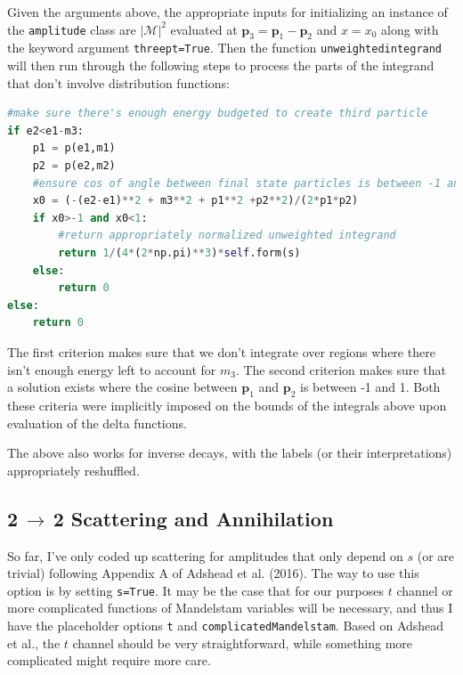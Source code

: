 \documentclass[superscriptaddress,nofootinbib,notitlepage,onecolumn]{revtex4-1}
\newcommand{\abs}[1]{\left| #1 \right|}
\renewcommand{\vec}[1]{\mathbf{#1}}
\newcommand{\code}[1]{\texttt{#1}}
\begin{document}
Given the arguments above, the appropriate inputs for initializing an instance of the \code{amplitude} class are $\abs{\mathcal{M}}^2$ evaluated at $\vec{p}_3 = \vec{p}_1 - \vec{p}_2$ and $x=x_0$ along with the keyword argument \code{threept=True}. Then the function \code{unweightedintegrand} will then run through the following steps to process the parts of the integrand that don't involve distribution functions:
\begin{lstlisting}[language=Python]
#make sure there's enough energy budgeted to create third particle
if e2<e1-m3:
	p1 = p(e1,m1)
	p2 = p(e2,m2)
	#ensure cos of angle between final state particles is between -1 and 1
	x0 = (-(e2-e1)**2 + m3**2 + p1**2 +p2**2)/(2*p1*p2)
	if x0>-1 and x0<1:
		#return appropriately normalized unweighted integrand
		return 1/(4*(2*np.pi)**3)*self.form(s)
	else:
		return 0
else:
	return 0
\end{lstlisting}
The first criterion makes sure that we don't integrate over regions where there isn't enough energy left to account for $m_3$. The second criterion makes sure that a solution exists where the cosine between $\vec{p}_1$ and $\vec{p}_2$ is between -1 and 1. Both these criteria were implicitly imposed on the bounds of the integrals above upon evaluation of the delta functions.

The above also works for inverse decays, with the labels (or their interpretations) appropriately reshuffled.
\subsection{2$\,\rightarrow\,$2 Scattering and Annihilation}
So far, I've only coded up scattering for amplitudes that only depend on $s$ (or are trivial) following Appendix A of Adshead et al. (2016). The way to use this option is by setting \code{s=True}. It may be the case that for our purposes $t$ channel or more complicated functions of Mandelstam variables will be necessary, and thus I have the placeholder options \code{t} and \code{complicatedMandelstam}. Based on Adshead et al., the $t$ channel should be very straightforward, while something more complicated might require more care.
\end{document}
